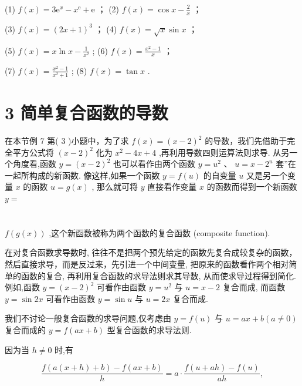 \documentclass[10pt]{article}
\begin{document}
(1) \(f\left( x\right)  = 3{\mathrm{e}}^{x} - {x}^{\mathrm{e}} + \mathrm{e}\) ； (2) \(f\left( x\right)  = \cos x - \frac{2}{x}\) ；

(3) \(f\left( x\right)  = {\left( 2x + 1\right) }^{3}\) ； (4) \(f\left( x\right)  = \sqrt{x}\sin x\) ；

(5) \(f\left( x\right)  = x\ln x - \frac{1}{{x}^{2}}\) ; (6) \(f\left( x\right)  = \frac{{x}^{2} - 1}{x}\) ；

(7) \(f\left( x\right)  = \frac{{x}^{2} - 1}{{x}^{2} + 1}\) ; (8) \(f\left( x\right)  = \tan x\) .

\section*{3 简单复合函数的导数}

在本节例 7 第( 3 )小题中，为了求 \(f\left( x\right)  = {\left( x - 2\right) }^{2}\) 的导数，我们先借助于完全平方公式将 \({\left( x - 2\right) }^{2}\) 化为 \({x}^{2} - {4x} + 4\) ,再利用导数四则运算法则求导. 从另一个角度看,函数 \(y = {\left( x - 2\right) }^{2}\) 也可以看作由两个函数 \(y = {u}^{2}\text{ 、 }u = x - {2}^{u}\) 套”在一起所构成的新函数. 像这样,如果一个函数 \(y = f\left( u\right)\) 的自变量 \(u\) 又是另一个变量 \(x\) 的函数 \(u = g\left( x\right)\) , 那么就可将 \(y\) 直接看作变量 \(x\) 的函数而得到一个新函数 \(y =\)

\section*{}

 \(f\left( {g\left( x\right) }\right)\) ,这个新函数被称为两个函数的复合函数 (composite function).

在对复合函数求导数时, 往往不是把两个预先给定的函数先复合成较复杂的函数，然后直接求导，而是反过来，先引进一个中间变量, 把原来的函数看作两个相对简单的函数的复合, 再利用复合函数的求导法则求其导数, 从而使求导过程得到简化. 例如,函数 \(y = {\left( x - 2\right) }^{2}\) 可看作由函数 \(y = {u}^{2}\) 与 \(u = x - 2\) 复合而成, 而函数 \(y = \sin {2x}\) 可看作由函数 \(y = \sin u\) 与 \(u = {2x}\) 复合而成.

我们不讨论一般复合函数的求导问题,仅考虑由 \(y = f\left( u\right)\) 与 \(u = {ax} + b\left( {a \neq  0}\right)\) 复合而成的 \(y = f\left( {{ax} + b}\right)\) 型复合函数的求导法则.

因为当 \(h \neq  0\) 时,有

\[
\frac{f\left( {a\left( {x + h}\right)  + b}\right)  - f\left( {{ax} + b}\right) }{h} = a \cdot  \frac{f\left( {u + {ah}}\right)  - f\left( u\right) }{ah},
\]
\end{document}
